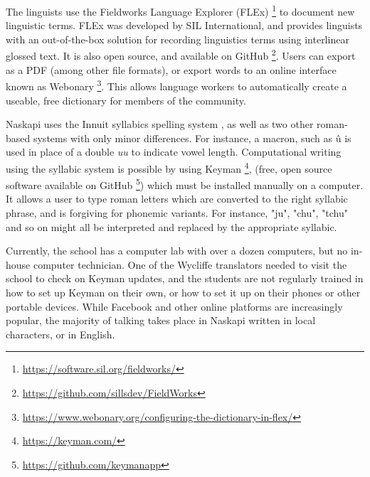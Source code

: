 The linguists use the Fieldworks Language Explorer (FLEx) \footnote{\href{https://software.sil.org/fieldworks/}{https://software.sil.org/fieldworks/}} to document new linguistic terms. FLEx was developed by SIL International, and provides linguists with an out-of-the-box solution for recording linguistics terms using interlinear glossed text. It is also open source, and available on GitHub \footnote{\href{https://github.com/sillsdev/FieldWorks}{https://github.com/sillsdev/FieldWorks}}. Users can export as a PDF (among other file formats), or export words to an online interface known as Webonary \footnote{\href{https://www.webonary.org/configuring-the-dictionary-in-flex/}{https://www.webonary.org/configuring-the-dictionary-in-flex/}}.
This allows language workers to automatically create a useable, free dictionary for members of the community.

Naskapi uses the Innuit syllabics spelling system \cite{wals-141},
as well as two other roman-based systems with only minor differences. For instance, a macron, such as \^u is used in place of a double \emph{uu} to indicate vowel length. Computational writing using the syllabic system is possible by using Keyman \footnote{\href{https://keyman.com/}{https://keyman.com/}}, (free, open source software available on GitHub \footnote{\href{https://github.com/keymanapp}{https://github.com/keymanapp}})
which must be installed manually on a computer. It allows a user to type roman letters which are converted to the right syllabic phrase, and is forgiving for phonemic variants. For instance, "ju", "chu", "tchu" and so on might all be interpreted and replaced by the appropriate syllabic. %

Currently, the school has a computer lab with over a dozen computers, but no in-house computer technician. One of the Wycliffe translators needed to visit the school to check on Keyman updates, and the students are not regularly trained in how to set up Keyman on their own, or how to set it up on their phones or other portable devices. While Facebook and other online platforms are increasingly popular, the majority of talking takes place in Naskapi written in local characters, or in English.

